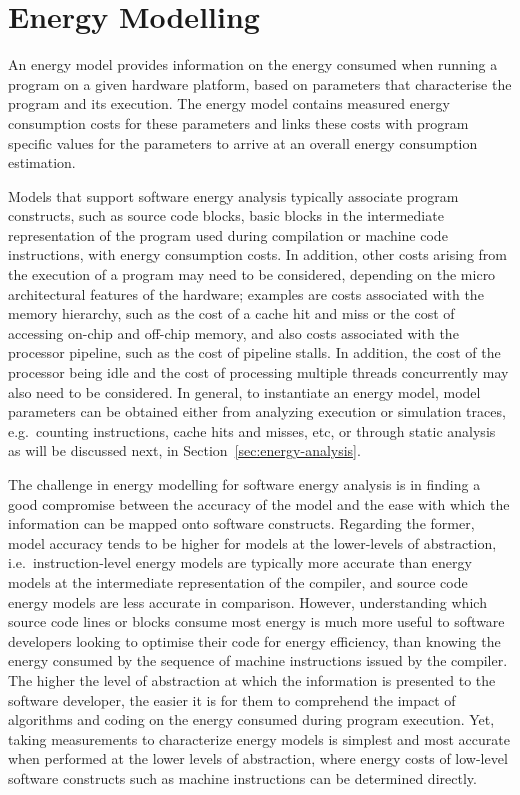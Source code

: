\nopagebreak
\section{Energy Modelling}\label{sec:energy-models}

An energy model provides information on the energy consumed when running a program on a given hardware platform, based on parameters that characterise the program and its execution. The energy model contains measured energy consumption costs for these parameters and links these costs with program specific values for the parameters to arrive at an overall energy consumption estimation. 

Models that support software energy analysis typically associate program constructs, such as source code blocks, basic blocks in the intermediate representation of the program used during compilation or machine code instructions, with energy consumption costs. In addition, other costs arising from the execution of a program may need to be considered, depending on the micro architectural features of the hardware; examples are costs associated with the memory hierarchy, such as the cost of a cache hit and miss or the cost of accessing on-chip and off-chip memory, and also costs associated with the processor pipeline, such as the cost of pipeline stalls. In addition, the cost of the processor being idle and the cost of processing multiple threads concurrently may also need to be considered. 
%
In general, to instantiate an energy model, model parameters can be obtained either from analyzing execution or simulation traces, e.g.\ counting instructions, cache hits and misses, etc, or through static analysis as will be discussed next, in Section~\ref{sec:energy-analysis}.

The challenge in energy modelling for software energy analysis is in finding a good compromise between the accuracy of the model and the ease with which the information can be mapped onto software constructs. Regarding the former, model accuracy tends to be higher for models at the lower-levels of abstraction, i.e.\ instruction-level energy models are typically more accurate than energy models at the intermediate representation of the compiler, and source code energy models are less accurate in comparison. 
%
However, understanding which source code lines or blocks consume most energy is much more useful to software developers looking to optimise their code for energy efficiency, than knowing the energy consumed by the sequence of machine instructions issued by the compiler. The higher the level of abstraction at which the information is presented to the software developer, the easier it is for them to comprehend the impact of algorithms and coding on the energy consumed during program execution. Yet, taking measurements to characterize energy models is simplest and most accurate when performed at the lower levels of abstraction, where energy costs of low-level software constructs such as machine instructions can be determined directly.



